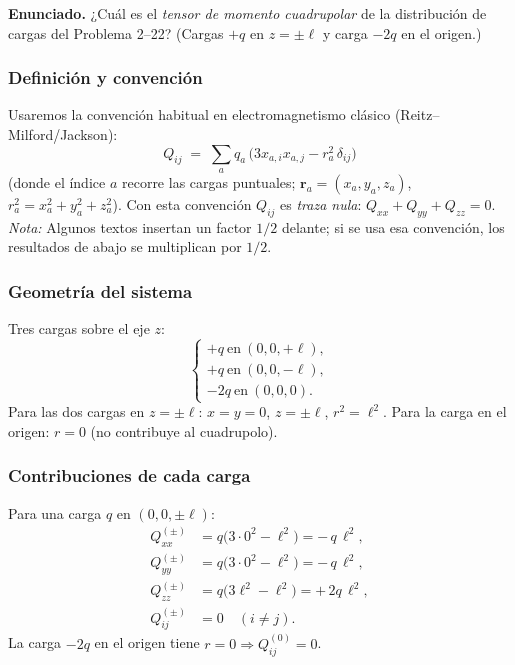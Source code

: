 \documentclass{article}
\begin{document}
\textbf{Enunciado.} \; ¿Cuál es el \emph{tensor de momento cuadrupolar} de la distribución de cargas del Problema 2–22? (Cargas $+q$ en $z=\pm \ell$ y carga $-2q$ en el origen.)

\subsubsection*{Definición y convención}
Usaremos la convención habitual en electromagnetismo clásico (Reitz–Milford/Jackson):
\[
\boxed{\quad Q_{ij}\;=\;\sum_a q_a\,\big(3 x_{a,i}x_{a,j}-r_a^{2}\,\delta_{ij}\big)\quad}
\]
(donde el índice $a$ recorre las cargas puntuales; $\mathbf r_a=(x_{a},y_{a},z_{a})$, $r_a^2=x_a^2+y_a^2+z_a^2$).  
Con esta convención $Q_{ij}$ es \emph{traza nula}: $Q_{xx}+Q_{yy}+Q_{zz}=0$.  
\emph{Nota:} Algunos textos insertan un factor $1/2$ delante; si se usa esa convención, los resultados de abajo se multiplican por $1/2$.

\subsubsection*{Geometría del sistema}
Tres cargas sobre el eje $z$:
\[
\begin{cases}
+q \ \text{en}\ (0,0,+\ell),\\
+q \ \text{en}\ (0,0,-\ell),\\
-2q \ \text{en}\ (0,0,0).
\end{cases}
\]
Para las dos cargas en $z=\pm\ell$: $x=y=0$, $z=\pm\ell$, $r^2=\ell^2$.  
Para la carga en el origen: $r=0$ (no contribuye al cuadrupolo).

\subsubsection*{Contribuciones de cada carga}
Para una carga $q$ en $(0,0,\pm\ell)$:
\[
\begin{aligned}
Q_{xx}^{(\pm)} &= q\big(3\cdot 0^2-\ell^2\big) = -\,q\,\ell^2,\\
Q_{yy}^{(\pm)} &= q\big(3\cdot 0^2-\ell^2\big) = -\,q\,\ell^2,\\
Q_{zz}^{(\pm)} &= q\big(3\ell^2-\ell^2\big) = +\,2q\,\ell^2,\\
Q_{ij}^{(\pm)} &= 0\quad (i\neq j).
\end{aligned}
\]
La carga $-2q$ en el origen tiene $r=0\Rightarrow Q_{ij}^{(0)}=0$.
\end{document}
